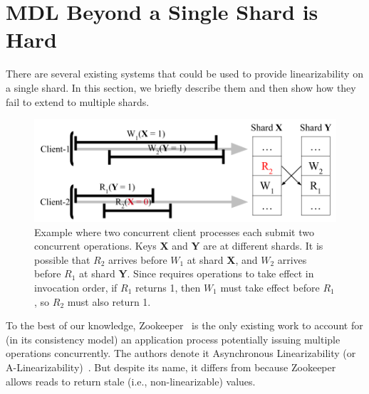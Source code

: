 \section{MDL Beyond a Single Shard is Hard}
\label{sec:mdl:zookeeper}



There are several existing systems that could be used to provide
\multidispatch{} linearizability on a single shard. In this section,
we briefly describe them and then show how they fail to extend to
multiple shards.

\begin{figure}[!tb]
    \centering
    \includegraphics[width=\linewidth]{figs/somet.png}
    \caption{Example where two concurrent client processes each submit two concurrent operations. Keys \textbf{X} and \textbf{Y} are at different shards. It is possible that $R_2$ arrives before $W_1$ at shard \textbf{X}, and $W_2$ arrives before $R_1$ at shard \textbf{Y}. Since \MDL{} requires operations to take effect in invocation order, if $R_1$ returns 1, then $W_1$ must take effect before $R_1$, so $R_2$ must also return 1.}
    \label{fig:concurrentbatches}
\end{figure}

To the best of our knowledge, Zookeeper~\cite{hunt2010zookeeper} is the
only existing work to account for (in its consistency model) an 
application process potentially issuing multiple operations concurrently. The authors denote it Asynchronous Linearizability
(or A-Linearizability)~\cite{hunt2010zookeeper}. But despite its name,
it differs from \MDL{} because Zookeeper allows
reads to return stale (i.e., non-linearizable) values.

